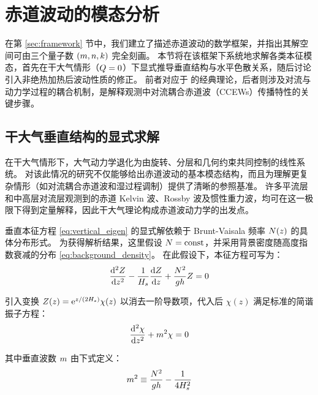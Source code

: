 \section{赤道波动的模态分析}
\label{sec:waves}

在第 \ref{sec:framework} 节中，我们建立了描述赤道波动的数学框架，并指出其解空间可由三个量子数 $(m, n, k)$ 完全刻画。
本节将在该框架下系统地求解各类本征模态，首先在干大气情形（$Q = 0$）下显式推导垂直结构与水平色散关系，随后讨论引入非绝热加热后波动性质的修正。
前者对应于 \citep{matsunoQuasiGeostrophicMotionsEquatorial1966} 的经典理论，后者则涉及对流与动力学过程的耦合机制，是解释观测中对流耦合赤道波（CCEWs）传播特性的关键步骤。

\subsection{干大气垂直结构的显式求解}
\label{subsec:vertical_structure}

在干大气情形下，大气动力学退化为由旋转、分层和几何约束共同控制的线性系统。
对该此情况的研究不仅能够给出赤道波动的基本模态结构，而且为理解更复杂情形（如对流耦合赤道波和湿过程调制）提供了清晰的参照基准。
许多平流层和中高层对流层观测到的赤道 Kelvin 波、Rossby 波及惯性重力波，均可在这一极限下得到定量解释，因此干大气理论构成赤道波动力学的出发点。

垂直本征方程 \eqref{eq:vertical_eigen} 的显式解依赖于 Brunt-Vaisala 频率 $N(z)$ 的具体分布形式。
为获得解析结果，这里假设 $N = \mathrm{const}$，并采用背景密度随高度指数衰减的分布 \eqref{eq:background_density}。
在此假设下，本征方程可写为：
\begin{equation}
    \ode[2]{\vertfunc}{z} - \frac{1}{\scaleheight} \ode{\vertfunc}{z} + \frac{\bvfreq^2}{\gravityconst \eqdepth} \vertfunc = 0
    \label{eq:vertical_ode}
\end{equation}

引入变换 $Z(z) = \mathrm{e}^{z/(2H_s)} \chi(z)$ 以消去一阶导数项，代入后 $\chi(z)$ 满足标准的简谐振子方程：
\begin{equation}
    \ode[2]{\chi}{z} + \vertmode^2 \chi = 0
    \label{eq:chi_equation}
\end{equation}

其中垂直波数 $m$ 由下式定义：
\begin{equation}
    m^2 \equiv \frac{N^2}{g h} - \frac{1}{4H_s^2}
    \label{eq:vertical_wavenumber}
\end{equation}

